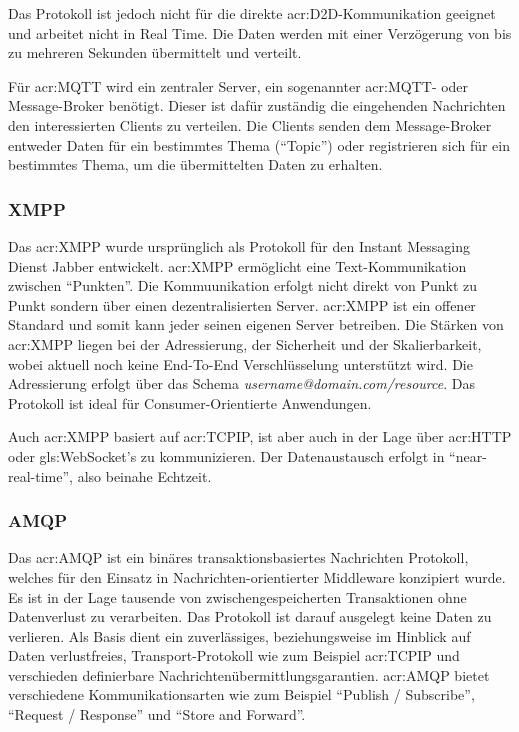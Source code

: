 Das Protokoll ist jedoch nicht für die direkte \gls{acr:D2D}-Kommunikation geeignet und arbeitet nicht in Real Time. Die Daten werden mit einer Verzögerung von bis zu mehreren Sekunden übermittelt und verteilt.

Für \gls{acr:MQTT} wird ein zentraler Server, ein sogenannter \gls{acr:MQTT}- oder Message-Broker benötigt. Dieser ist dafür zuständig die eingehenden Nachrichten den interessierten Clients zu verteilen. Die Clients senden dem Message-Broker entweder Daten für ein bestimmtes Thema ("`Topic"') oder registrieren sich für ein bestimmtes Thema, um die übermittelten Daten zu erhalten.



\subsubsection{XMPP}
Das \gls{acr:XMPP} wurde ursprünglich als Protokoll für den Instant Messaging Dienst Jabber entwickelt. \gls{acr:XMPP} ermöglicht eine Text-Kommunikation zwischen "`Punkten"'. Die Kommuunikation erfolgt nicht direkt von Punkt zu Punkt sondern über einen dezentralisierten Server. \gls{acr:XMPP} ist ein offener Standard und somit kann jeder seinen eigenen Server betreiben. Die Stärken von \gls{acr:XMPP} liegen bei der Adressierung, der Sicherheit und der Skalierbarkeit, wobei aktuell noch keine End-To-End Verschlüsselung unterstützt wird. Die Adressierung erfolgt über das Schema \textit{username@domain.com/resource}. Das Protokoll ist ideal für Consumer-Orientierte Anwendungen.

Auch \gls{acr:XMPP} basiert auf \gls{acr:TCPIP}, ist aber auch in der Lage über \gls{acr:HTTP} oder \gls{gls:WebSocket}'s zu kommunizieren. Der Datenaustausch erfolgt in "`near-real-time"', also beinahe Echtzeit.



\subsubsection{AMQP}
Das \gls{acr:AMQP} ist ein binäres transaktionsbasiertes Nachrichten Protokoll, welches für den Einsatz in Nachrichten-orientierter Middleware konzipiert wurde. Es ist in der Lage tausende von zwischengespeicherten Transaktionen ohne Datenverlust zu verarbeiten. Das Protokoll ist darauf ausgelegt keine Daten zu verlieren. Als Basis dient ein zuverlässiges, beziehungsweise im Hinblick auf Daten verlustfreies, Transport-Protokoll wie zum Beispiel \gls{acr:TCPIP} und verschieden definierbare Nachrichtenübermittlungsgarantien. \gls{acr:AMQP} bietet verschiedene Kommunikationsarten wie zum Beispiel "`Publish / Subscribe"', "`Request / Response"' und "`Store and Forward"'. 

